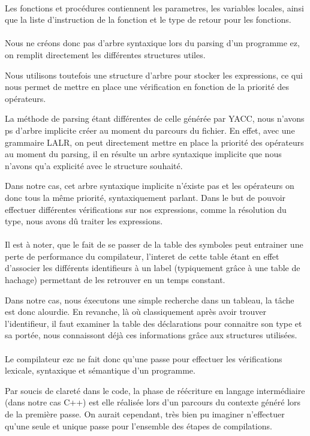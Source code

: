 \paragraph{}Les fonctions et procédures contiennent les parametres, les variables locales, ainsi que 
la liste d'instruction de la fonction et le type de retour pour les fonctions.

\paragraph{}Nous ne créons donc pas d'arbre syntaxique lors du parsing d'un programme ez, on remplit
directement les différentes structures utiles. 

Nous utilisons toutefois une structure d'arbre pour stocker les expressions, ce qui nous permet 
de mettre en place une vérification en fonction de la priorité des opérateurs.

La méthode de parsing étant différentes de celle générée par YACC, nous n'avons ps d'arbre
implicite créer au moment du parcours du fichier. En effet, avec une grammaire LALR, on peut directement
mettre en place la priorité des opérateurs au moment du parsing, il en résulte un arbre syntaxique
implicite que nous n'avons qu'a explicité avec le structure souhaité.

Dans notre cas, cet arbre syntaxique implicite n'éxiste pas et les opérateurs on donc tous la même priorité,
syntaxiquement parlant. Dans le but de pouvoir effectuer différentes vérifications sur nos expressions, comme la résolution
du type, nous avons dû traiter les expressions.


\paragraph{}Il est à noter, que le fait de se passer de la table des symboles peut entrainer 
une perte de performance du compilateur, l'interet de cette table étant en effet d'associer les 
différents identifieurs à un label (typiquement grâce à une table de hachage) permettant de les 
retrouver en un temps constant.

Dans notre cas, nous éxecutons une simple recherche dans un tableau,
la tâche est donc alourdie. En revanche, là où classiquement après avoir trouver l'identifieur, 
il faut examiner la table des déclarations pour connaitre son type et sa portée, 
nous connaissont déjà ces informations grâce aux structures utilisées.

\paragraph{}Le compilateur ezc ne fait donc qu'une passe pour effectuer les vérifications lexicale, 
syntaxique et sémantique d'un programme.

Par soucis de clareté dans le code, la phase de réécriture en langage intermédiaire (dans notre cas C++)
est elle réalisée lors d'un parcours du contexte généré lors de la première passe. On aurait cependant, très bien
pu imaginer n'effectuer qu'une seule et unique passe pour l'ensemble des étapes de compilations.


